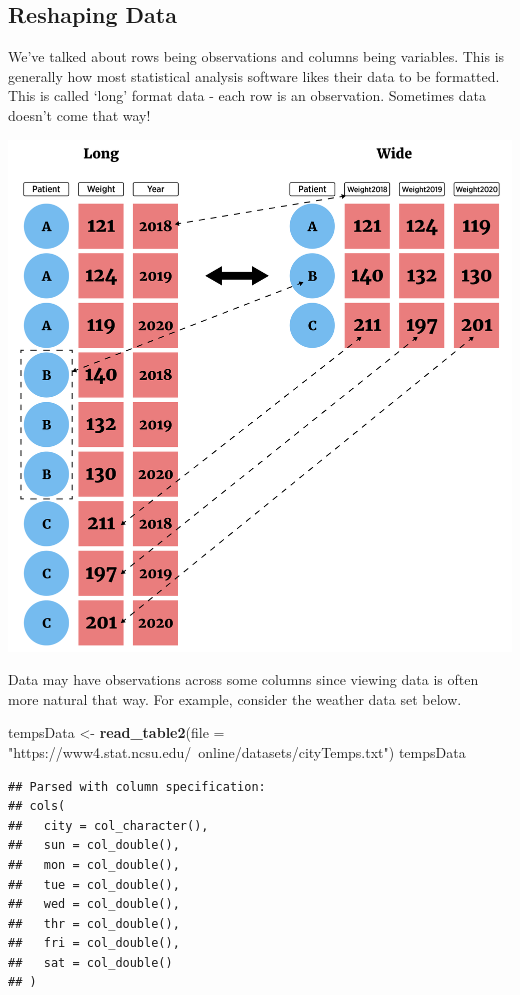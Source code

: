 \documentclass[
]{book}
\newenvironment{Shaded}{\begin{snugshade}}{\end{snugshade}}
\newcommand{\DataTypeTok}[1]{\textcolor[rgb]{0.13,0.29,0.53}{#1}}
\newcommand{\KeywordTok}[1]{\textcolor[rgb]{0.13,0.29,0.53}{\textbf{#1}}}
\newcommand{\NormalTok}[1]{#1}
\newcommand{\StringTok}[1]{\textcolor[rgb]{0.31,0.60,0.02}{#1}}
\theoremstyle{definition}
\theoremstyle{definition}
\theoremstyle{definition}
\theoremstyle{remark}
\begin{document}
\hypertarget{reshaping-data-1}{%
\subsection{Reshaping Data}\label{reshaping-data-1}}

We've talked about rows being observations and columns being variables. This is generally how most statistical analysis software likes their data to be formatted. This is called `long' format data - each row is an observation. Sometimes data doesn't come that way!

\begin{center}\includegraphics[width=0.7\linewidth]{img/longWideF} \end{center}

Data may have observations across some columns since viewing data is often more natural that way. For example, consider the weather data set below.

\begin{Shaded}
\begin{Highlighting}[]
\NormalTok{tempsData <-}\StringTok{ }\KeywordTok{read_table2}\NormalTok{(}\DataTypeTok{file =} \StringTok{"https://www4.stat.ncsu.edu/~online/datasets/cityTemps.txt"}\NormalTok{) }
\NormalTok{tempsData}
\end{Highlighting}
\end{Shaded}

\begin{verbatim}
## Parsed with column specification:
## cols(
##   city = col_character(),
##   sun = col_double(),
##   mon = col_double(),
##   tue = col_double(),
##   wed = col_double(),
##   thr = col_double(),
##   fri = col_double(),
##   sat = col_double()
## )
\end{verbatim}
\end{document}
